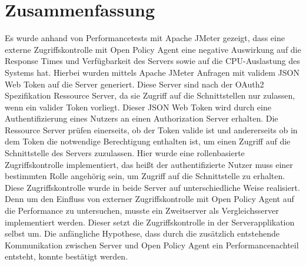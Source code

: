 \chapter{Zusammenfassung}
\label{Zusammenfassung}
Es wurde anhand von Performancetests mit Apache JMeter gezeigt, dass eine externe Zugriffskontrolle mit Open Policy Agent eine negative Auswirkung auf die Response Times und Verfügbarkeit des Servers sowie auf die CPU-Auslastung des Systems hat. Hierbei wurden mittels Apache JMeter Anfragen mit validem JSON Web Token auf die Server generiert. Diese Server sind nach der OAuth2 Spezifikation Ressource Server, da sie Zugriff auf die Schnittstellen nur zulassen, wenn ein valider Token vorliegt. Dieser JSON Web Token wird durch eine Authentifizierung eines Nutzers an einen Authorization Server erhalten. Die Ressource Server prüfen einerseits, ob der Token valide ist und andererseits ob in dem Token die notwendige Berechtigung enthalten ist, um einen Zugriff auf die Schnittstelle des Servers zuzulassen. Hier wurde eine rollenbasierte Zugriffskontrolle implementiert, das heißt der authentifizierte Nutzer muss einer bestimmten Rolle angehörig sein, um Zugriff auf die Schnittstelle zu erhalten. Diese Zugriffskontrolle wurde in beide Server auf unterschiedliche Weise realisiert. Denn um den Einfluss von externer Zugriffskontrolle mit Open Policy Agent auf die Performance zu untersuchen, musste ein Zweitserver als Vergleichsserver implementiert werden. Dieser setzt die Zugriffskontrolle in der Serverapplikation selbst um. Die anfängliche Hypothese, dass durch die zusätzlich entstehende Kommunikation zwischen Server und Open Policy Agent ein Performancenachteil entsteht, konnte bestätigt werden.\bigskip

